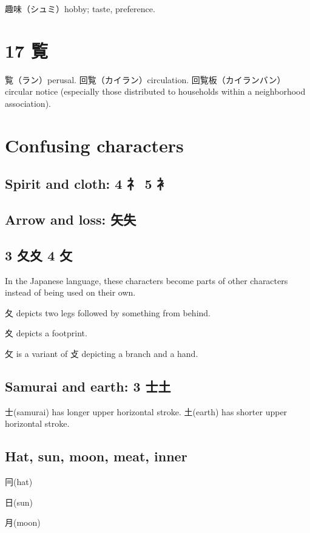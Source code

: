 趣味（シュミ）hobby; taste, preference.

\section{17 覧}

覧（ラン）perusal.
回覧（カイラン）circulation.
回覧板（カイランバン）circular notice
(especially those distributed to households within a neighborhood association).

\section{Confusing characters}

\subsection{Spirit and cloth: 4 礻 5 衤}

\subsection{Arrow and loss: 矢失}

\subsection{3 夂夊 4 攵}

In the Japanese language,
these characters become parts of other characters
instead of being used on their own.

夂 depicts two legs followed by something from behind.

夊 depicts a footprint.

攵 is a variant of 攴 depicting a branch and a hand.

\subsection{Samurai and earth: 3 士土}

士(samurai) has longer upper horizontal stroke.
土(earth) has shorter upper horizontal stroke.

\subsection{Hat, sun, moon, meat, inner}

冃(hat)

日(sun)

月(moon)


